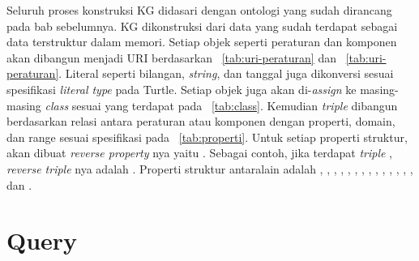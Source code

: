 Seluruh proses konstruksi KG didasari dengan ontologi yang sudah dirancang pada bab sebelumnya. KG
dikonstruksi dari data \legal yang sudah terdapat sebagai data terstruktur dalam memori. Setiap
objek seperti peraturan dan komponen akan dibangun menjadi URI berdasarkan
\tab~\ref{tab:uri-peraturan} dan \tab~\ref{tab:uri-peraturan}. Literal seperti bilangan,
\textit{string}, dan tanggal juga dikonversi sesuai spesifikasi \textit{literal type} pada Turtle.
Setiap objek juga akan di-\textit{assign} ke masing-masing \textit{class} sesuai yang terdapat pada
\tab~\ref{tab:class}. Kemudian \textit{triple} dibangun berdasarkan relasi antara peraturan atau
komponen dengan properti, domain, dan range sesuai spesifikasi pada \tab~\ref{tab:properti}. Untuk
setiap properti struktur, akan dibuat \textit{reverse property} nya yaitu .
Sebagai contoh, jika terdapat \textit{triple} ,
\textit{reverse triple} nya adalah . Properti struktur
antaralain adalah , , , ,
, , , ,
, , , , ,
, dan .




\section{Query}
\label{sec:query}

